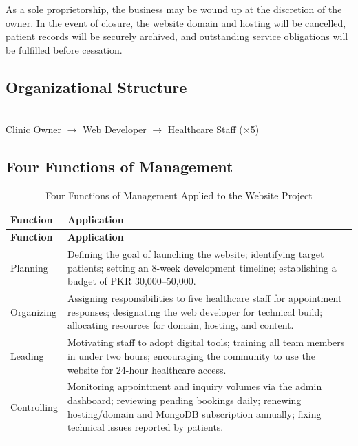 \documentclass[12pt, a4paper]{article}
\begin{document}
As a sole proprietorship, the business may be wound up at the discretion of the owner. In the event of closure, the website domain and hosting will be cancelled, patient records will be securely archived, and outstanding service obligations will be fulfilled before cessation.

\subsection{Organizational Structure}

\begin{center}
\\[10pt]
{\small Clinic Owner $\rightarrow$ Web Developer $\rightarrow$ Healthcare Staff (×5)}
\end{center}

\subsection{Four Functions of Management}

\begin{longtable}{@{} L{3cm} L{11.4cm} @{}}
\toprule
\textbf{Function} & \textbf{Application} \\
\midrule
\endfirsthead
\toprule
\textbf{Function} & \textbf{Application} \\
\midrule
\endhead
Planning &
Defining the goal of launching the website; identifying target patients; setting an 8-week development timeline; establishing a budget of PKR 30,000–50,000. \\[6pt]
Organizing &
Assigning responsibilities to five healthcare staff for appointment responses; designating the web developer for technical build; allocating resources for domain, hosting, and content. \\[6pt]
Leading &
Motivating staff to adopt digital tools; training all team members in under two hours; encouraging the community to use the website for 24-hour healthcare access. \\[6pt]
Controlling &
Monitoring appointment and inquiry volumes via the admin dashboard; reviewing pending bookings daily; renewing hosting/domain and MongoDB subscription annually; fixing technical issues reported by patients. \\
\bottomrule
\caption{Four Functions of Management Applied to the Website Project}
\end{longtable}
\end{document}
